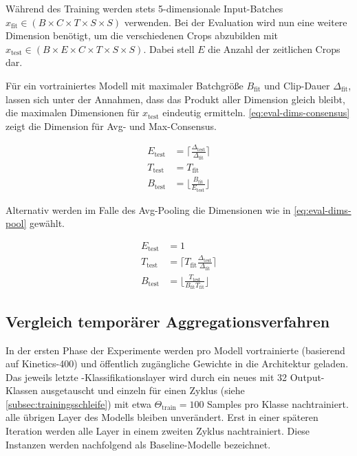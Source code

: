 Während des Training werden stets 5-dimensionale Input-Batches $x_\text{fit} \in (B \times C \times T \times S \times S)$ verwenden.
Bei der Evaluation wird nun eine weitere Dimension benötigt, um die verschiedenen Crops abzubilden mit $x_\text{test} \in (B \times E \times C \times T \times S \times S)$.
Dabei stell $E$ die Anzahl der zeitlichen Crops dar.

Für ein vortrainiertes Modell mit maximaler Batchgröße $B_\text{fit}$ und Clip-Dauer $\Delta_\text{fit}$, lassen sich unter der Annahmen, dass das Produkt aller Dimension gleich bleibt, die maximalen Dimensionen für $x_\text{test}$ eindeutig ermitteln.
\autoref{eq:eval-dims-consensus} zeigt die Dimension für Avg- und Max-Consensus.

\begin{equation}
    \label{eq:eval-dims-consensus}
    \begin{split}
    E_\text{test}           & = \lceil  \frac{\Delta_\text{test}}{\Delta_\text{fit}}  \rceil \\
    T_\text{test}           & = T_{\text{fit}} \\
    B_\text{test}           & = \lfloor \frac{B_\text{fit}}{E_\text{test}} \rfloor
    \end{split}
\end{equation}

Alternativ werden im Falle des Avg-Pooling die Dimensionen wie in \autoref{eq:eval-dims-pool} gewählt.

\begin{equation}
    \label{eq:eval-dims-pool}
    \begin{split}
    E_\text{test}           & = 1 \\
    T_\text{test}           & = \lceil T_\text{fit} \frac{\Delta_\text{test}}{\Delta_\text{fit}} \rceil \\
    B_\text{test}           & = \lfloor \frac{T_\text{test} }{B_\text{fit} T_\text{fit}} \rfloor
    \end{split}
\end{equation}

\subsection{Vergleich temporärer Aggregationsverfahren}
\label{subsec:initialisierungsphase}

In der ersten Phase der Experimente werden pro Modell vortrainierte (basierend auf Kinetics-400) und öffentlich zugängliche Gewichte in die Architektur geladen.
Das jeweils letzte \fc-Klassifikationslayer wird durch ein neues mit 32 Output-Klassen ausgetauscht und einzeln für einen Zyklus (siehe \autoref{subsec:trainingsschleife}) mit etwa $\Theta_\text{train} = 100$ Samples pro Klasse nachtrainiert.
\Dh alle übrigen Layer des Modells bleiben unverändert.
Erst in einer späteren Iteration werden alle Layer in einem zweiten Zyklus nachtrainiert.
Diese Instanzen werden nachfolgend als Baseline-Modelle bezeichnet.

